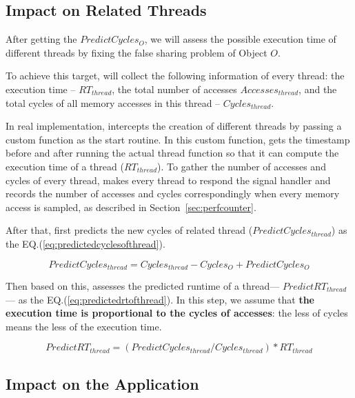 \subsection{Impact on Related Threads}
\label{sec:impactthread}

After getting the $PredictCycles_{O}$, we will assess the possible execution time of different threads by fixing the false sharing problem of Object $O$. 

To achieve this target, \Cheetah{} will collect the following information of every thread: the execution time -- $RT_{thread}$, the total number of accesses $Accesses_{thread}$, and the total cycles of all memory accesses in this thread -- $Cycles_{thread}$.

In real implementation, \cheetah{} intercepts the creation of different threads by passing a custom function as the start routine. In this custom function, \cheetah{} gets the timestamp before and after running the actual thread function so that it can compute the execution time of a thread ($RT_{thread}$). To gather the number of accesses and cycles of every thread, \cheetah{} makes every thread to respond the signal handler and records the number of accesses and cycles correspondingly when every memory access is sampled, as described in Section~\ref{sec:perfcounter}. 

After that, \cheetah{} first predicts the new cycles of related thread ($PredictCycles_{thread}$) as the EQ.(\ref{eq:predictedcyclesofthread}).

\begin{equation}
\label{eq:predictedcyclesofthread}
 PredictCycles_{thread} = Cycles_{thread} - Cycles_{O} + PredictCycles_{O} 
\end{equation} 
 

Then based on this, \cheetah{} assesses the predicted runtime of a thread--- $PredictRT_{thread}$--- as the EQ.(\ref{eq:predictedrtofthread}). In this step, we assume that {\bf the execution time is proportional to the cycles of accesses}: the less of cycles means the less of the execution time.  

\begin{equation}
\label{eq:predictedrtofthread}
 PredictRT_{thread} = (PredictCycles_{thread}/Cycles_{thread}) * RT_{thread} 
\end{equation} 

\subsection{Impact on the Application}
\label{sec:impactapp}

